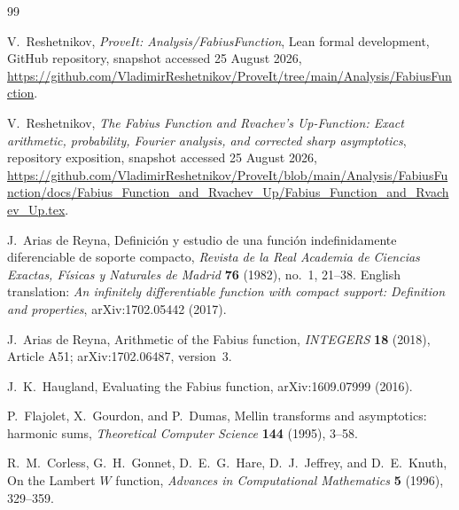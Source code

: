 \documentclass[11pt,oneside]{article}
\theoremstyle{definition}
\theoremstyle{remark}
\begin{document}
\renewcommand{\refname}{Dossier references}
\begin{thebibliography}{99}

V.~Reshetnikov,
\newblock \emph{ProveIt: Analysis/FabiusFunction}, Lean formal development,
\newblock GitHub repository, snapshot accessed 25 August 2026,
\newblock \url{https://github.com/VladimirReshetnikov/ProveIt/tree/main/Analysis/FabiusFunction}.

V.~Reshetnikov,
\newblock \emph{The Fabius Function and Rvachev's Up-Function: Exact arithmetic, probability, Fourier analysis, and corrected sharp asymptotics},
\newblock repository exposition, snapshot accessed 25 August 2026,
\newblock \url{https://github.com/VladimirReshetnikov/ProveIt/blob/main/Analysis/FabiusFunction/docs/Fabius_Function_and_Rvachev_Up/Fabius_Function_and_Rvachev_Up.tex}.

J.~Arias de Reyna,
\newblock Definici\'on y estudio de una funci\'on indefinidamente diferenciable de soporte compacto,
\newblock \emph{Revista de la Real Academia de Ciencias Exactas, F\'isicas y Naturales de Madrid}
\textbf{76} (1982), no.~1, 21--38.
\newblock English translation: \emph{An infinitely differentiable function with compact support: Definition and properties}, arXiv:1702.05442 (2017).

J.~Arias de Reyna,
\newblock Arithmetic of the Fabius function,
\newblock \emph{INTEGERS} \textbf{18} (2018), Article A51; arXiv:1702.06487, version~3.

J.~K.~Haugland,
\newblock Evaluating the Fabius function,
\newblock arXiv:1609.07999 (2016).

P.~Flajolet, X.~Gourdon, and P.~Dumas,
\newblock Mellin transforms and asymptotics: harmonic sums,
\newblock \emph{Theoretical Computer Science} \textbf{144} (1995), 3--58.

R.~M.~Corless, G.~H.~Gonnet, D.~E.~G.~Hare, D.~J.~Jeffrey, and D.~E.~Knuth,
\newblock On the Lambert $W$ function,
\newblock \emph{Advances in Computational Mathematics} \textbf{5} (1996), 329--359.

\end{thebibliography}


\renewcommand{\arraystretch}{1}
\end{document}
